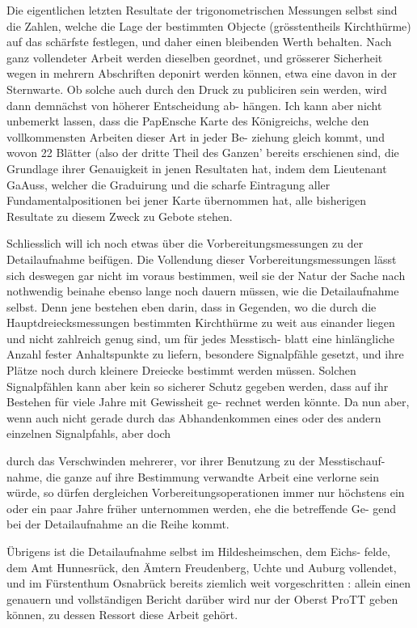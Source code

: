 \documentclass[12pt,a4paper]{article}
\theoremstyle{plain}
\theoremstyle{definition}
\theoremstyle{remark}
\begin{document}
\noindent
Die eigentlichen letzten Resultate der trigonometrischen Messungen selbst
sind die Zahlen, welche die Lage der bestimmten Objecte (grösstentheils
Kirchthürme) auf das schärfste festlegen, und daher einen bleibenden Werth
behalten. Nach ganz vollendeter Arbeit werden dieselben geordnet, und
grösserer Sicherheit wegen in mehrern Abschriften deponirt werden können,
etwa eine davon in der Sternwarte. Ob solche auch durch den Druck zu
publiciren sein werden, wird dann demnächst von höherer Entscheidung ab-
hängen. Ich kann aber nicht unbemerkt lassen, dass die PapEnsche Karte
des Königreichs, welche den vollkommensten Arbeiten dieser Art in jeder Be-
ziehung gleich kommt, und wovon 22 Blätter (also der dritte Theil des Ganzen'
bereits erschienen sind, die Grundlage ihrer Genauigkeit in jenen Resultaten
hat, indem dem Lieutenant GaAuss, welcher die Graduirung und die scharfe
Eintragung aller Fundamentalpositionen bei jener Karte übernommen hat, alle
bisherigen Resultate zu diesem Zweck zu Gebote stehen.

\noindent
Schliesslich will ich noch etwas über die Vorbereitungsmessungen zu
der Detailaufnahme beifügen. Die Vollendung dieser Vorbereitungsmessungen
lässt sich deswegen gar nicht im voraus bestimmen, weil sie der Natur der
Sache nach nothwendig beinahe ebenso lange noch dauern müssen, wie die
Detailaufnahme selbst. Denn jene bestehen eben darin, dass in Gegenden,
wo die durch die Hauptdreiecksmessungen bestimmten Kirchthürme zu weit
aus einander liegen und nicht zahlreich genug sind, um für jedes Messtisch-
blatt eine hinlängliche Anzahl fester Anhaltspunkte zu liefern, besondere
Signalpfähle gesetzt, und ihre Plätze noch durch kleinere Dreiecke bestimmt
werden müssen. Solchen Signalpfählen kann aber kein so sicherer Schutz
gegeben werden, dass auf ihr Bestehen für viele Jahre mit Gewissheit ge-
rechnet werden könnte. Da nun aber, wenn auch nicht gerade durch das
Abhandenkommen eines oder des andern einzelnen Signalpfahls, aber doch

\noindent

\noindent
durch das Verschwinden mehrerer, vor ihrer Benutzung zu der Messtischauf-
nahme, die ganze auf ihre Bestimmung verwandte Arbeit eine verlorne sein
würde, so dürfen dergleichen Vorbereitungsoperationen immer nur höchstens
ein oder ein paar Jahre früher unternommen werden, ehe die betreffende Ge-
gend bei der Detailaufnahme an die Reihe kommt.

\noindent
Übrigens ist die Detailaufnahme selbst im Hildesheimschen, dem Eichs-
felde, dem Amt Hunnesrück, den Ämtern Freudenberg, Uchte und Auburg
vollendet, und im Fürstenthum Osnabrück bereits ziemlich weit vorgeschritten :
allein einen genauern und vollständigen Bericht darüber wird nur der Oberst
ProTT geben können, zu dessen Ressort diese Arbeit gehört.
\end{document}
